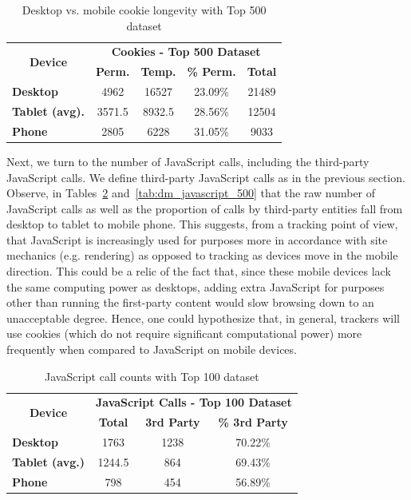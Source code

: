 \documentclass{acm_proc_article-sp}
\begin{document}
\begin{table}[h]
  \centering
  \caption{Desktop vs. mobile cookie longevity with Top 500 dataset}
    \begin{tabular}{|c|c|c|c|c|}
    \hline
    \multicolumn{1}{|c|}{\multirow{2}[4]{*}{\textbf{Device}}} & \multicolumn{4}{|c|}{\textbf{Cookies - Top 500 Dataset}} \\ \cline{2-5}
    \multicolumn{1}{|c|}{} & \textbf{Perm.} & \textbf{Temp.} & \textbf{\% Perm.} & \textbf{Total} \\ \hline
    \multicolumn{1}{|l|}{\textbf{Desktop}} & 4962  & 16527  & 23.09\% & 21489 \\
    \multicolumn{1}{|l|}{\textbf{Tablet (avg).}} & 3571.5  & 8932.5  & 28.56\% & 12504 \\
    \multicolumn{1}{|l|}{\textbf{Phone}}  & 2805  & 6228  & 31.05\% & 9033 \\  \hline
    \end{tabular}%
  \label{tab:dm_cookie_longeivity}%
\end{table}%

Next, we turn to the number of JavaScript calls, including the third-party JavaScript calls. We define third-party JavaScript calls as in the previous section. Observe, in Tables~\ref{tab:dm_javascript_100} and~\ref{tab:dm_javascript_500} that the raw number of JavaScript calls as well as the proportion of calls by third-party entities fall from desktop to tablet to mobile phone. This suggests, from a tracking point of view, that JavaScript is increasingly used for purposes more in accordance with site mechanics (e.g. rendering) as opposed to tracking as devices move in the mobile direction. This could be a relic of the fact that, since these mobile devices lack the same computing power as desktops, adding extra JavaScript for purposes other than running the first-party content would slow browsing down to an unacceptable degree. Hence, one could hypothesize that, in general, trackers will use cookies (which do not require significant computational power) more frequently when compared to JavaScript on mobile devices.


\begin{table}[h]
  \centering
  \caption{JavaScript call counts with Top 100 dataset}
    \begin{tabular}{|c|c|c|c|}
    \hline
    \multicolumn{1}{|c|}{\multirow{2}[4]{*}{\textbf{Device}}} & \multicolumn{3}{|c|}{\textbf{JavaScript Calls - Top 100 Dataset}} \\ \cline{2-4}
    \multicolumn{1}{|c|}{} & \multicolumn{1}{|c|}{\textbf{Total}} & \multicolumn{1}{|c|}{\textbf{3rd Party}} & \multicolumn{1}{|c|}{\textbf{\% 3rd Party}}  \\ \hline
    \multicolumn{1}{|l|}{\textbf{Desktop}} & 1763   & 1238  & 70.22\% \\
    \multicolumn{1}{|l|}{\textbf{Tablet (avg.)}} & 1244.5   & 864 & 69.43\%  \\
    \multicolumn{1}{|l|}{\textbf{Phone}} & 798  & 454  & 56.89\% \\ \hline
    \end{tabular}%
  \label{tab:dm_javascript_100}%
\end{table}%
\end{document}
